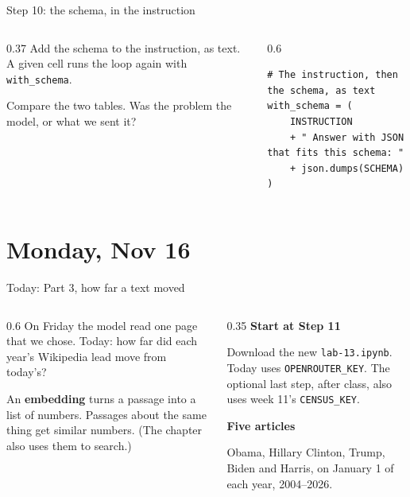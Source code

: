 \documentclass[9pt,aspectratio=169]{beamer}
\begin{document}
\begin{frame}[fragile]{Step 10: the schema, in the instruction}
    \begin{columns}[T]
        \begin{column}{0.37\textwidth}
            Add the schema to the instruction, as text. A given cell runs the loop again with \texttt{with\_schema}.

            \medskip
            Compare the two tables. Was the problem the model, or what we sent it?
        \end{column}
        \begin{column}{0.6\textwidth}
\begin{lstlisting}
# The instruction, then the schema, as text
with_schema = (
    INSTRUCTION
    + " Answer with JSON that fits this schema: "
    + json.dumps(SCHEMA)
)
\end{lstlisting}
        \end{column}
    \end{columns}
\end{frame}

\section{Monday, Nov 16}

\begin{frame}{Today: Part 3, how far a text moved}
    \begin{columns}[T]
        \begin{column}{0.6\textwidth}
            On Friday the model read one page that we chose. Today: how far did each year's Wikipedia lead move from today's?

            \medskip
            An \textbf{embedding} turns a passage into a list of numbers. Passages about the same thing get similar numbers. (The chapter also uses them to search.)
        \end{column}
        \begin{column}{0.35\textwidth}
            \textbf{Start at Step 11}\\[2pt]
            {\footnotesize Download the new \texttt{lab-13.ipynb}. Today uses \texttt{OPENROUTER\_KEY}. The optional last step, after class, also uses week 11's \texttt{CENSUS\_KEY}.\par}
            \medskip
            \textbf{Five articles}\\[2pt]
            {\footnotesize Obama, Hillary Clinton, Trump, Biden and Harris, on January 1 of each year, 2004--2026.\par}
        \end{column}
    \end{columns}
\end{frame}
\end{document}
